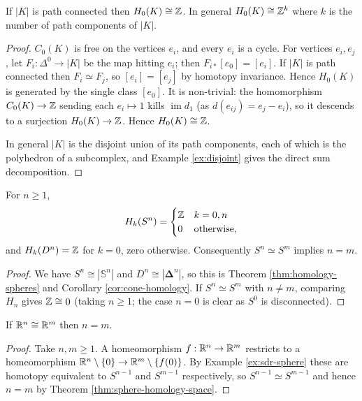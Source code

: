 \documentclass[a4paper]{scrartcl}
\newcommand{\bDelta}{\boldsymbol{\Delta}}
\newcommand{\sS}{\mathbb{S}}
\begin{document}
\begin{proposition} \label{prop:h0}
	If $|K|$ is path connected then $H_0(K)\cong\mathbb{Z}$. In general $H_0(K)\cong\mathbb{Z}^k$ where $k$ is the number of path components of $|K|$.
\end{proposition}
\begin{proof}
	$C_0(K)$ is free on the vertices $e_i$, and every $e_i$ is a cycle. For vertices $e_i, e_j$, let $F_i: \Delta^0 \to |K|$ be the map hitting $e_i$; then $F_{i*}[e_0] = [e_i]$. If $|K|$ is path connected then $F_i \simeq F_j$, so $[e_i] = [e_j]$ by homotopy invariance. Hence $H_0(K)$ is generated by the single class $[e_0]$. It is non-trivial: the homomorphism $C_0(K)\to\mathbb{Z}$ sending each $e_i \mapsto 1$ kills $\operatorname{im}d_1$ (as $d(e_{ij}) = e_j - e_i$), so it descends to a surjection $H_0(K)\to\mathbb{Z}$. Hence $H_0(K)\cong\mathbb{Z}$.

	In general $|K|$ is the disjoint union of its path components, each of which is the polyhedron of a subcomplex, and Example \ref{ex:disjoint} gives the direct sum decomposition.
\end{proof}

\begin{theorem} \label{thm:sphere-homology-space}
	For $n \geq 1$,
	$$
	H_k(S^n) = \begin{cases}\mathbb{Z} & k = 0, n\\ 0 & \text{otherwise},\end{cases}
	$$
	and $H_k(D^n) = \mathbb{Z}$ for $k = 0$, zero otherwise. Consequently $S^n \simeq S^m$ implies $n = m$.
\end{theorem}
\begin{proof}
	We have $S^n \cong |\sS^n|$ and $D^n \cong |\bDelta^n|$, so this is Theorem \ref{thm:homology-spheres} and Corollary \ref{cor:cone-homology}. If $S^n \simeq S^m$ with $n \neq m$, comparing $H_n$ gives $\mathbb{Z} \cong 0$ (taking $n \geq 1$; the case $n = 0$ is clear as $S^0$ is disconnected).
\end{proof}

\begin{corollary}
	If $\mathbb{R}^n \cong \mathbb{R}^m$ then $n = m$.
\end{corollary}
\begin{proof}
	Take $n, m \geq 1$. A homeomorphism $f: \mathbb{R}^n \to \mathbb{R}^m$ restricts to a homeomorphism $\mathbb{R}^n\setminus\{0\}\to\mathbb{R}^m\setminus\{f(0)\}$. By Example \ref{ex:sdr-sphere} these are homotopy equivalent to $S^{n-1}$ and $S^{m-1}$ respectively, so $S^{n-1}\simeq S^{m-1}$ and hence $n = m$ by Theorem \ref{thm:sphere-homology-space}.
\end{proof}
\end{document}
